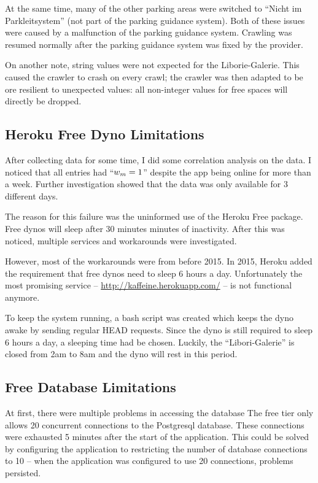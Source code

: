 At the same time, many of the other parking areas were switched to ``Nicht im Parkleitsystem'' (not part of the parking guidance system). Both of these issues were caused by a malfunction of the parking guidance system. Crawling was resumed normally after the parking guidance system was fixed by the provider.

On another note, string values were not expected for the Liborie-Galerie. This caused the crawler to crash on every crawl; the crawler was then adapted to be ore resilient to unexpected values: all non-integer values for free spaces will directly be dropped.

\subsection{Heroku Free Dyno Limitations}

After collecting data for some time, I did some correlation analysis on the data. I noticed that all entries had ``\(w_m = 1\)'' despite the app being online for more than a week. Further investigation showed that the data was only available for 3 different days. 

The reason for this failure was the uninformed use of the Heroku Free package. Free dynos will sleep after 30 minutes minutes of inactivity. After this was noticed, multiple services and workarounds were investigated.

However, most of the workarounds were from before 2015. In 2015, Heroku added the requirement that free dynos need to sleep 6 hours a day. Unfortunately the most promising service -- \url{http://kaffeine.herokuapp.com/} -- is not functional anymore.

To keep the system running, a bash script was created which keeps the dyno awake by sending regular HEAD requests. Since the dyno is still required to sleep 6 hours a day, a sleeping time had be chosen. Luckily, the ``Libori-Galerie'' is closed from 2am to 8am and the dyno will rest in this period. 

\subsection{Free Database Limitations}
At first, there were multiple problems in accessing the database The free tier only allows 20 concurrent connections to the Postgresql database. These connections were exhausted 5 minutes after the start of the application. This could be solved by configuring the application to restricting the number of database connections to 10 -- when the application was configured to use 20 connections, problems persisted.

